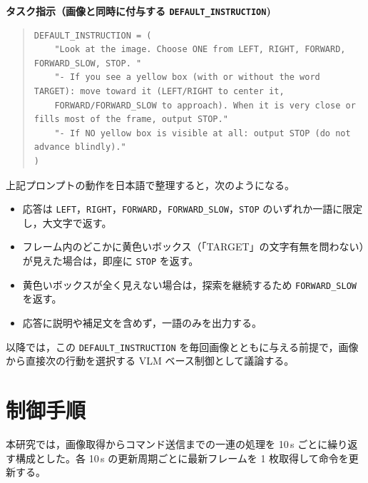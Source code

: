 \documentclass[a4paper,11pt]{ltjsreport}
\begin{document}
\textbf{タスク指示（画像と同時に付与する \texttt{DEFAULT\_INSTRUCTION})}
\begin{quote}\footnotesize
\begin{verbatim}
DEFAULT_INSTRUCTION = (
    "Look at the image. Choose ONE from LEFT, RIGHT, FORWARD, FORWARD_SLOW, STOP. "
    "- If you see a yellow box (with or without the word TARGET): move toward it (LEFT/RIGHT to center it, 
    FORWARD/FORWARD_SLOW to approach). When it is very close or fills most of the frame, output STOP."
    "- If NO yellow box is visible at all: output STOP (do not advance blindly)."
)
\end{verbatim}
\end{quote}

上記プロンプトの動作を日本語で整理すると，次のようになる。
\begin{itemize}
  \item 応答は \texttt{LEFT}，\texttt{RIGHT}，\texttt{FORWARD}，\texttt{FORWARD\_SLOW}，\texttt{STOP} のいずれか一語に限定し，大文字で返す。
  \item フレーム内のどこかに黄色いボックス（「TARGET」の文字有無を問わない）が見えた場合は，即座に \texttt{STOP} を返す。
  \item 黄色いボックスが全く見えない場合は，探索を継続するため \texttt{FORWARD\_SLOW} を返す。
  \item 応答に説明や補足文を含めず，一語のみを出力する。
\end{itemize}

以降では，この \texttt{DEFAULT\_INSTRUCTION} を毎回画像とともに与える前提で，画像から直接次の行動を選択する VLM ベース制御として議論する。

\section{制御手順}
本研究では，画像取得からコマンド送信までの一連の処理を 10\,s ごとに繰り返す構成とした。各 10\,s の更新周期ごとに最新フレームを 1 枚取得して命令を更新する。
\end{document}
